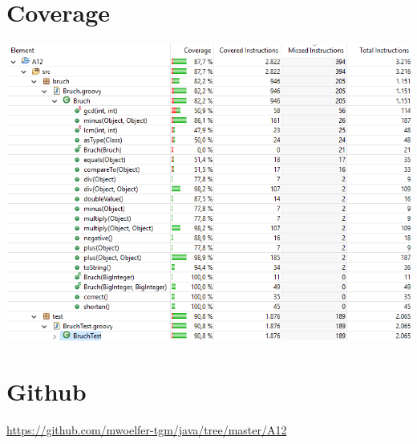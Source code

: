 \section{Coverage}
\begin{minipage}{\linewidth}
	\centering
	\includegraphics[width=1\linewidth]{images/pic5}
\end{minipage}

\section{Github}
\url{https://github.com/mwoelfer-tgm/java/tree/master/A12}